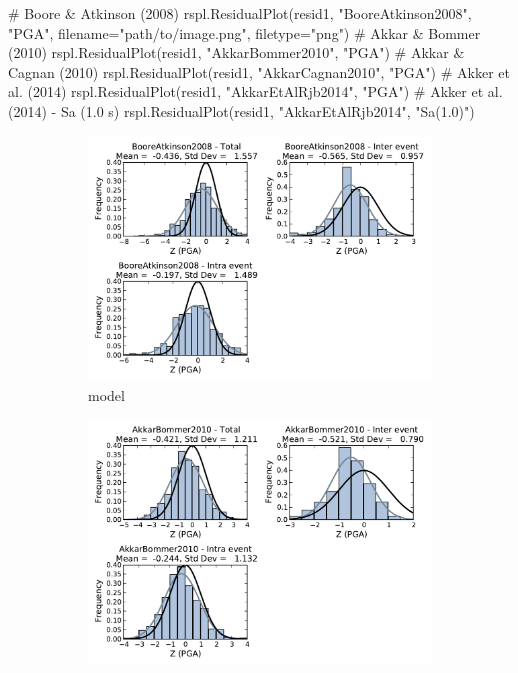 \begin{python}
# Boore & Atkinson (2008)
rspl.ResidualPlot(resid1, "BooreAtkinson2008", "PGA",
                  filename="path/to/image.png",
                  filetype="png")
# Akkar & Bommer (2010)
rspl.ResidualPlot(resid1, "AkkarBommer2010", "PGA")
# Akkar & Cagnan (2010)
rspl.ResidualPlot(resid1, "AkkarCagnan2010", "PGA")
# Akker et al. (2014)
rspl.ResidualPlot(resid1, "AkkarEtAlRjb2014", "PGA")
# Akker et al. (2014) - Sa (1.0 s)
rspl.ResidualPlot(resid1, "AkkarEtAlRjb2014", "Sa(1.0)")
\end{python}

\begin{figure}[htb]
  \centering
  \begin{subfigure}[b]{0.49\textwidth}
      \includegraphics[width=\textwidth]{./figures/residuals/BA2008_Residuals_PGA.pdf}
      \caption{\textcite{boore2008} model}
      \label{fig:pga_res_ba2008}
  \end{subfigure}
    \begin{subfigure}[b]{0.49\textwidth}
      \includegraphics[width=\textwidth]{./figures/residuals/AB2010_Residuals_PGA.pdf}

\end{subfigure}
\end{figure}

